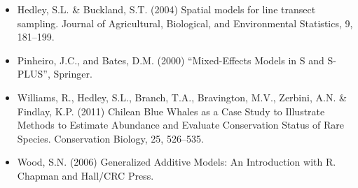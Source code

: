 \documentclass[]{amsart}
\begin{document}
\begin{itemize}
\itemsep1pt\parskip0pt
\item
  Hedley, S.L. \& Buckland, S.T. (2004) Spatial models for line transect
  sampling. Journal of Agricultural, Biological, and Environmental
  Statistics, 9, 181--199.
\item
  Pinheiro, J.C., and Bates, D.M. (2000) ``Mixed-Effects Models in S and
  S-PLUS'', Springer.
\item
  Williams, R., Hedley, S.L., Branch, T.A., Bravington, M.V., Zerbini,
  A.N. \& Findlay, K.P. (2011) Chilean Blue Whales as a Case Study to
  Illustrate Methods to Estimate Abundance and Evaluate Conservation
  Status of Rare Species. Conservation Biology, 25, 526--535.
\item
  Wood, S.N. (2006) Generalized Additive Models: An Introduction with R.
  Chapman and Hall/CRC Press.
\end{itemize}
\end{document}
